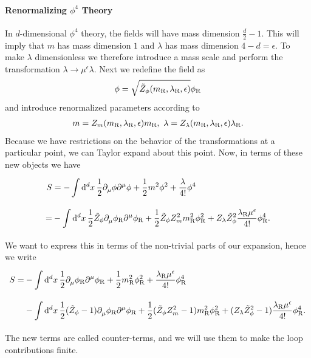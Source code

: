 \paragraph{Renormalizing $\phi^{4}$ Theory}
In $d$-dimensional $\phi^{4}$ theory, the fields will have mass dimension $\frac{d}{2} - 1$. This will imply that $m$ has mass dimension $1$ and $\lambda$ has mass dimension $4 - d = \epsilon$. To make $\lambda$ dimensionless we therefore introduce a mass scale and perform the transformation $\lambda\to\mu^{\epsilon}\lambda$. Next we redefine the field as
\begin{align*}
	\phi = \sqrt{\tilde{Z}_{\phi}(m_{\text{R}}, \lambda_{\text{R}}, \epsilon)}\phi_{\text{R}}
\end{align*}
and introduce renormalized parameters according to
\begin{align*}
	m = Z_{m}(m_{\text{R}}, \lambda_{\text{R}}, \epsilon)m_{\text{R}},\ \lambda = Z_{\lambda}(m_{\text{R}}, \lambda_{\text{R}}, \epsilon)\lambda_{\text{R}}.
\end{align*}
Because we have restrictions on the behavior of the transformations at a particular point, we can Taylor expand about this point. Now, in terms of these new objects we have
\begin{align*}
	S &= -\int\limits_{}^{}\dd[d]{x}\frac{1}{2}\partial^{}_{\mu}\phi\partial^{\mu}_{}\phi + \frac{1}{2}m^{2}\phi^{2} + \frac{\lambda}{4!}\phi^{4} \\
	  =& -\int\limits_{}^{}\dd[d]{x}\frac{1}{2}\tilde{Z}_{\phi}\partial^{}_{\mu}\phi_{\text{R}}\partial^{\mu}_{}\phi_{\text{R}} + \frac{1}{2}\tilde{Z}_{\phi}Z_{m}^{2}m_{\text{R}}^{2}\phi_{\text{R}}^{2} + Z_{\lambda}\tilde{Z}_{\phi}^{2}\frac{\lambda_{\text{R}}\mu^{\epsilon}}{4!}\phi_{\text{R}}^{4}.
\end{align*}
We want to express this in terms of the non-trivial parts of our expansion, hence we write
\begin{align*}
	S =& -\int\limits_{}^{}\dd[d]{x}\frac{1}{2}\partial^{}_{\mu}\phi_{\text{R}}\partial^{\mu}_{}\phi_{\text{R}} + \frac{1}{2}m_{\text{R}}^{2}\phi_{\text{R}}^{2} + \frac{\lambda_{\text{R}}\mu^{\epsilon}}{4!}\phi_{\text{R}}^{4} \\
	   &- \int\limits_{}^{}\dd[d]{x}\frac{1}{2}(\tilde{Z}_{\phi} - 1)\partial^{}_{\mu}\phi_{\text{R}}\partial^{\mu}_{}\phi_{\text{R}} + \frac{1}{2}(\tilde{Z}_{\phi}Z_{m}^{2} - 1)m_{\text{R}}^{2}\phi_{\text{R}}^{2} + (Z_{\lambda}\tilde{Z}_{\phi}^{2} - 1)\frac{\lambda_{\text{R}}\mu^{\epsilon}}{4!}\phi_{\text{R}}^{4}.
\end{align*}
The new terms are called counter-terms, and we will use them to make the loop contributions finite.

